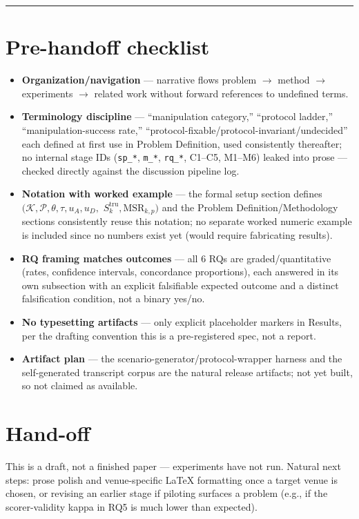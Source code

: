 \documentclass[11pt]{article}
\begin{document}
\vspace{1em}
\hrule
\vspace{1em}

\section*{Pre-handoff checklist}
\begin{itemize}[leftmargin=1.4em]
\item \textbf{Organization/navigation} --- narrative flows problem $\to$ method $\to$ experiments $\to$ related work without forward references to undefined terms.
\item \textbf{Terminology discipline} --- ``manipulation category,'' ``protocol ladder,'' ``manipulation-success rate,'' ``protocol-fixable/protocol-invariant/undecided'' each defined at first use in Problem Definition, used consistently thereafter; no internal stage IDs (\texttt{sp\_*}, \texttt{m\_*}, \texttt{rq\_*}, C1--C5, M1--M6) leaked into prose --- checked directly against the discussion pipeline log.
\item \textbf{Notation with worked example} --- the formal setup section defines $(\mathcal{K}, \mathcal{P}, \theta, \tau, u_A, u_D,$ $S^{\mathrm{tru}}_k, \mathrm{MSR}_{k,p})$ and the Problem Definition/Methodology sections consistently reuse this notation; no separate worked numeric example is included since no numbers exist yet (would require fabricating results).
\item \textbf{RQ framing matches outcomes} --- all 6 RQs are graded/quantitative (rates, confidence intervals, concordance proportions), each answered in its own subsection with an explicit falsifiable expected outcome and a distinct falsification condition, not a binary yes/no.
\item \textbf{No typesetting artifacts} --- only explicit placeholder markers in Results, per the drafting convention this is a pre-registered spec, not a report.
\item \textbf{Artifact plan} --- the scenario-generator/protocol-wrapper harness and the self-generated transcript corpus are the natural release artifacts; not yet built, so not claimed as available.
\end{itemize}

\section*{Hand-off}
This is a draft, not a finished paper --- experiments have not run. Natural next steps: prose polish and venue-specific LaTeX formatting once a target venue is chosen, or revising an earlier stage if piloting surfaces a problem (e.g., if the scorer-validity kappa in RQ5 is much lower than expected).



\end{document}
